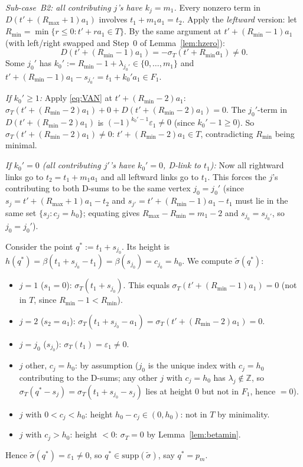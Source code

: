 \medskip\noindent\textit{Sub-case~B2: all contributing $j$'s have $k_j=m_1$.}
Every nonzero term in $D(t'+(R_{\max}+1)a_1)$ involves $t_1+m_1 a_1=t_2$.
Apply the \emph{leftward} version:
let $R_{\min}=\min\{r\le0:t'+ra_1\in T\}$.
By the same argument at $t'+(R_{\min}-1)a_1$
(with left/right swapped and Step~0 of Lemma~\ref{lem:hzero}):
\begin{equation}\label{eq:Dleft}
  D(t'+(R_{\min}-1)a_1)=-\sigma_T(t'+R_{\min}a_1)\ne0.
\end{equation}
Some $j_0'$ has $k_0':=R_{\min}-1+\lambda_{j_0'}\in\{0,\ldots,m_1\}$
and $t'+(R_{\min}-1)a_1-s_{j_0'}=t_1+k_0'a_1\in F_1$.

\textit{If $k_0'\ge1$:}
Apply \eqref{eq:VAN} at $t'+(R_{\min}-2)a_1$:
$\sigma_T(t'+(R_{\min}-2)a_1)+0+D(t'+(R_{\min}-2)a_1)=0$.
The $j_0'$-term in $D(t'+(R_{\min}-2)a_1)$ is $(-1)^{k_0'-1}\varepsilon_1\ne0$
(since $k_0'-1\ge0$).
So $\sigma_T(t'+(R_{\min}-2)a_1)\ne0$: $t'+(R_{\min}-2)a_1\in T$,
contradicting $R_{\min}$ being minimal.

\textit{If $k_0'=0$ (all contributing $j'$'s have $k_0'=0$, D-link to $t_1$):}
Now all rightward links go to $t_2=t_1+m_1 a_1$ and all leftward links go to $t_1$.
This forces the $j$'s contributing to both D-sums to be the same vertex $j_0=j_0'$
(since $s_j=t'+(R_{\max}+1)a_1-t_2$ and $s_{j'}=t'+(R_{\min}-1)a_1-t_1$
must lie in the same set $\{s_j:c_j=h_0\}$; equating gives $R_{\max}-R_{\min}=m_1-2$
and $s_{j_0}=s_{j_0'}$, so $j_0=j_0'$).

Consider the point $q^*:=t_1+s_{j_0}$.
Its height is $h(q^*)=\beta(t_1+s_{j_0}-t_1)=\beta(s_{j_0})=c_{j_0}=h_0$.
We compute $\tilde\sigma(q^*)$:
\begin{itemize}
\item $j=1$ ($s_1=0$): $\sigma_T(t_1+s_{j_0})$.
  This equals $\sigma_T(t'+(R_{\min}-1)a_1)=0$ (not in $T$, since $R_{\min}-1<R_{\min}$).
\item $j=2$ ($s_2=a_1$): $\sigma_T(t_1+s_{j_0}-a_1)=\sigma_T(t'+(R_{\min}-2)a_1)=0$.
\item $j=j_0$ ($s_{j_0}$): $\sigma_T(t_1)=\varepsilon_1\ne0$.
\item $j$ other, $c_j=h_0$: by assumption ($j_0$ is the unique index with
  $c_j=h_0$ contributing to the D-sums; any other $j$ with $c_j=h_0$ has
  $\lambda_j\notin\mathbb{Z}$, so $\sigma_T(q^*-s_j)=\sigma_T(t_1+s_{j_0}-s_j)$
  lies at height $0$ but not in $F_1$, hence $=0$).
\item $j$ with $0<c_j<h_0$: height $h_0-c_j\in(0,h_0)$: not in $T$ by minimality.
\item $j$ with $c_j>h_0$: height $<0$: $\sigma_T=0$ by Lemma~\ref{lem:betamin}.
\end{itemize}
Hence $\tilde\sigma(q^*)=\varepsilon_1\ne0$, so $q^*\in\mathrm{supp}(\tilde\sigma)$, say $q^*=p_m$.

